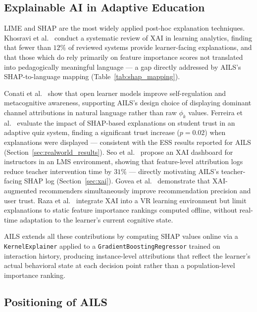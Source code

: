 \documentclass[ASNA,twocolumn]{USG} %
\begin{document}
\subsection{Explainable AI in Adaptive Education}

LIME \cite{Ribeiro2016} and SHAP \cite{Lundberg2017} are
the most widely applied post-hoc explanation techniques.
Khosravi et al.\ \cite{Khosravi2022} conduct a systematic
review of XAI in learning analytics, finding that fewer
than $12\%$ of reviewed systems provide learner-facing
explanations, and that those which do rely primarily on
feature importance scores not translated into
pedagogically meaningful language --- a gap directly
addressed by AILS's SHAP-to-language mapping
(Table~\ref{tab:shap_mapping}).

Conati et al.\ \cite{Conati2023} show that open learner
models improve self-regulation and metacognitive awareness,
supporting AILS's design choice of displaying dominant
channel attributions in natural language rather than raw
$\phi_k$ values.
Ferreira et al.\ \cite{Ferreira2024} evaluate the impact
of SHAP-based explanations on student trust in an
adaptive quiz system, finding a significant trust increase
($p{=}0.02$) when explanations were displayed --- consistent
with the ESS results reported for AILS
(Section~\ref{sec:realworld_results}).
Seo et al.\ \cite{Seo2024} propose an XAI dashboard for
instructors in an LMS environment, showing that
feature-level attribution logs reduce teacher intervention
time by $31\%$ --- directly motivating AILS's
teacher-facing SHAP log
(Section~\ref{sec:xai}).
Govea et al.\ \cite{Govea2024} demonstrate that
XAI-augmented recommenders simultaneously improve
recommendation precision and user trust.
Raza et al.\ \cite{Raza2024} integrate XAI into a VR
learning environment but limit explanations to static
feature importance rankings computed offline, without
real-time adaptation to the learner's current cognitive
state.

AILS extends all these contributions by computing SHAP
values online via a \texttt{KernelExplainer} applied to
a \texttt{GradientBoostingRegressor} trained on
interaction history, producing instance-level attributions
that reflect the learner's actual behavioral state at
each decision point rather than a population-level
importance ranking.

\subsection{Positioning of AILS}
\label{sec:positioning}
\end{document}
